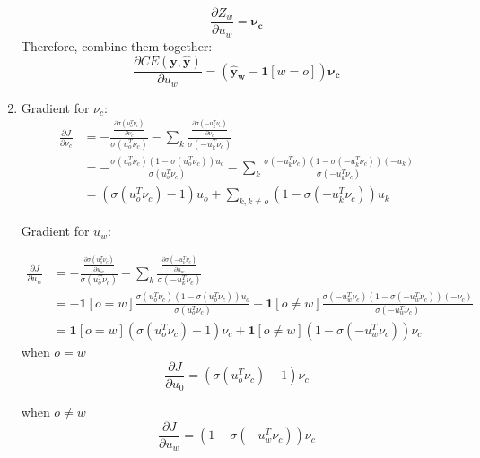 \documentclass[10pt]{article}
\begin{document}
\begin{enumerate}[label=(\alph*)]
\begin{equation*}
	\frac{\partial Z_w}{\partial u_w} = \mathbf{\nu_c}
\end{equation*}
Therefore, combine them together:
\begin{equation*}
	\frac{\partial CE(\mathbf{y}, \mathbf{\hat{y}})}{\partial u_w} = (\mathbf{\hat{y}_w} - \mathbf{1}[w=o])\mathbf{\nu_c}
\end{equation*}

\item
Gradient for $\nu_c$:
\begin{equation*}
\begin{aligned}
	\frac{\partial J}{\partial \nu_c} & = -\frac{\frac{\partial \sigma(u_o^T\nu_c)}{\partial \nu_c}}{\sigma(u_o^T\nu_c)} - \sum_k \frac{\frac{\partial \sigma(-u_k^T\nu_c)}{\partial \nu_c}}{\sigma(-u_k^T\nu_c)}\\
	& = -\frac{\sigma(u_o^T\nu_c)(1-\sigma(u_o^T\nu_c))u_o}{\sigma(u_o^T\nu_c)} - \sum_k \frac{\sigma(-u_k^T\nu_c)(1-\sigma(-u_k^T\nu_c))(-u_k)}{\sigma(-u_k^T\nu_c)}\\
	& = (\sigma(u_o^T\nu_c)-1)u_o + \sum_{k, k\neq o}(1-\sigma(-u_k^T\nu_c))u_k
\end{aligned}
\end{equation*}

Gradient for $u_w$:

\begin{equation*}
\begin{aligned}
	\frac{\partial J}{\partial u_w} & = -\frac{\frac{\partial \sigma(u_o^T\nu_c)}{\partial u_w}}{\sigma(u_o^T\nu_c)} - \sum_k \frac{\frac{\partial \sigma(-u_k^T\nu_c)}{\partial u_w}}{\sigma(-u_k^T\nu_c)}\\
	& = -\mathbf{1}[o=w]\frac{\sigma(u_o^T\nu_c)(1-\sigma(u_o^T\nu_c))u_o}{\sigma(u_o^T\nu_c)} - \mathbf{1}[o\neq w]\frac{\sigma(-u_w^T\nu_c)(1-\sigma(-u_w^T\nu_c))(-\nu_c)}{\sigma(-u_w^T\nu_c)}\\
	& = \mathbf{1}[o=w](\sigma(u_o^T\nu_c)-1)\nu_c + \mathbf{1}[o\neq w](1-\sigma(-u_w^T\nu_c))\nu_c
\end{aligned}
\end{equation*}
when $o=w$
\begin{equation}
\frac{\partial J}{\partial u_0} = (\sigma(u_o^T\nu_c)-1)\nu_c
\end{equation}

when $o\neq w$
\begin{equation}
\frac{\partial J}{\partial u_w} = (1-\sigma(-u_w^T\nu_c))\nu_c
\end{equation}


\end{enumerate}
\end{document}

